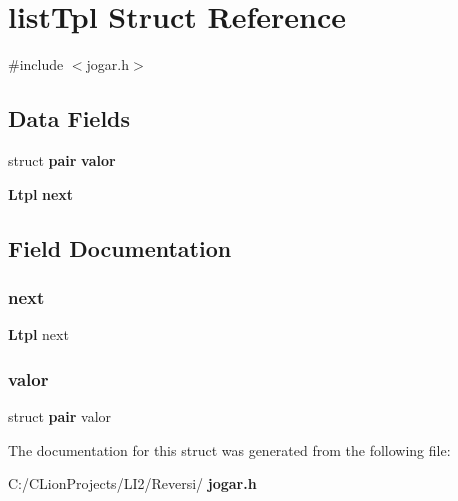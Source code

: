 \section{list\+Tpl Struct Reference}
\label{structlist_tpl}


{\ttfamily \#include $<$jogar.\+h$>$}

\subsection*{Data Fields}
\begin{DoxyCompactItemize}
\item 
struct \textbf{ pair} \textbf{ valor}
\item 
\textbf{ Ltpl} \textbf{ next}
\end{DoxyCompactItemize}


\subsection{Field Documentation}
\mbox{\label{structlist_tpl_a46e2f1643f355b05aa6d0bfe87cc8e58}} 
\subsubsection{next}
{\footnotesize\ttfamily \textbf{ Ltpl} next}

\mbox{\label{structlist_tpl_aa82ce503a315856e9d63a0bfe1cd8e76}} 
\subsubsection{valor}
{\footnotesize\ttfamily struct \textbf{ pair} valor}



The documentation for this struct was generated from the following file\+:\begin{DoxyCompactItemize}
\item 
C\+:/\+C\+Lion\+Projects/\+L\+I2/\+Reversi/\textbf{ jogar.\+h}\end{DoxyCompactItemize}
